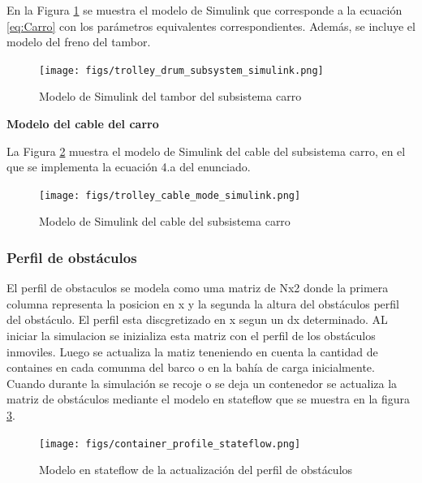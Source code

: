 \documentclass{article}
\begin{document}
            En la Figura \ref{fig:trolley_drum_mode_simulink} se muestra el modelo de Simulink que corresponde a la ecuación \ref{eq:Carro} con los parámetros equivalentes correspondientes. Además, se incluye el modelo del freno del tambor.
            
            \begin{figure} [H]
                \centering
                \texttt{[image: figs/trolley\_drum\_subsystem\_simulink.png]}
                \caption{Modelo de Simulink del tambor del subsistema carro}
                \label{fig:trolley_drum_mode_simulink}
            \end{figure}
            
            \textbf{Modelo del cable del carro}
            
            La Figura \ref{fig:trolley_cable_mode_simulink} muestra el modelo de Simulink del cable del subsistema carro, en el que se implementa la ecuación 4.a del enunciado.
            
            \begin{figure} [H]
                \centering
                \texttt{[image: figs/trolley\_cable\_mode\_simulink.png]}
                \caption{Modelo de Simulink del cable del subsistema carro}
                \label{fig:trolley_cable_mode_simulink}
            \end{figure}
            



            


            \subsubsection{Perfil de obstáculos}
            El perfil de obstaculos se modela como uma matriz de Nx2 donde la primera columna representa la posicion en x y la segunda la altura del obstáculos perfil del obstáculo. El perfil esta discgretizado en x segun un dx determinado. 
            AL iniciar la simulacion se inizializa esta matriz con el perfil de los obstáculos inmoviles. Luego se actualiza la matiz teneniendo en cuenta la cantidad de containes en cada comunma del barco o en la bahía de carga inicialmente.
            Cuando durante la simulación se recoje o se deja un contenedor se actualiza la matriz de obstáculos mediante el modelo en stateflow que se muestra en la figura \ref{fig:container_profile_stateflow}.
            \begin{figure} [H]
                \centering
                \texttt{[image: figs/container\_profile\_stateflow.png]}
                \caption{Modelo en stateflow de la actualización del perfil de obstáculos}
                \label{fig:container_profile_stateflow}
            \end{figure}
    
\end{document}

